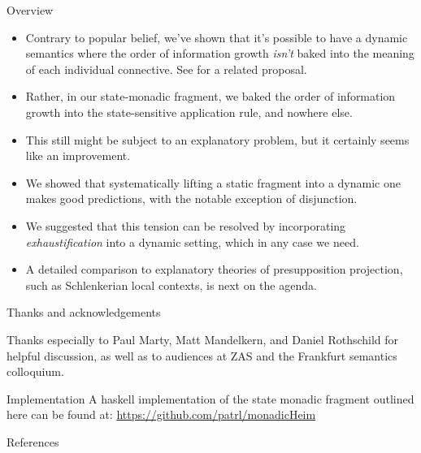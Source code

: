 \documentclass{beamer}
\begin{document}
  \begin{frame}[allowframebreaks]{Overview}

    \begin{itemize}

        \item Contrary to popular belief, we've shown that it's possible to have a dynamic semantics where the order of information growth \textit{isn't} baked into the meaning of each individual connective. See \citet{rothschild2017} for a related proposal.

        \item Rather, in our state-monadic fragment, we baked the order of information growth into the state-sensitive application rule, and nowhere else.

        \item This still might be subject to an explanatory problem, but it certainly seems like an improvement.

        \framebreak

      \item We showed that systematically lifting a static fragment into a dynamic one makes good predictions, with the notable exception of disjunction.

       \item We suggested that this tension can be resolved by incorporating \textit{exhaustification} into a dynamic setting, which in any case we need.

        \item A detailed comparison to explanatory theories of presupposition projection, such as Schlenkerian local contexts, is next on the agenda.

    \end{itemize}

  \end{frame}

  \begin{frame}{Thanks and acknowledgements}

    Thanks especially to Paul Marty, Matt Mandelkern, and Daniel Rothschild for helpful discussion, as well as to audiences at ZAS and the Frankfurt semantics colloquium.
    \vspace{10ex}
    \begin{block}{Implementation}
    A haskell implementation of the state monadic fragment outlined here can be found at: \url{https://github.com/patrl/monadicHeim}
    \end{block}

  \end{frame}

\begin{frame}[allowframebreaks]{References}

 \printbibliography[heading=none]

\end{frame}
\end{document}
